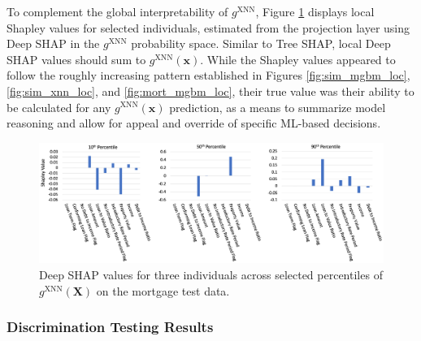 \documentclass[information,article,accept,moreauthors,pdftex]{Definitions/mdpi}
\begin{document}
{{{To complement the global interpretability of $g^\text{XNN}$, Figure \ref{fig:mort_xnn_loc} displays local Shapley values for selected individuals, estimated from the projection layer using Deep SHAP in the $g^\text{XNN}$ probability space. Similar to Tree SHAP, local Deep SHAP values should sum to $g^\text{XNN}(\mathbf{x})$. While the Shapley values appeared to follow the roughly increasing pattern established in Figures \ref{fig:sim_mgbm_loc}, \ref{fig:sim_xnn_loc}, and \ref{fig:mort_mgbm_loc}, their true value was their ability to be calculated for any $g^\text{XNN}(\mathbf{x})$ prediction, as a means to summarize model reasoning and allow for appeal and override of specific ML-based decisions. 

\begin{figure}[H]
\centering
\includegraphics[width=15cm]{img/mort_xnn_loc.png}
\caption{Deep SHAP values for three individuals across selected percentiles of $g^\text{XNN}(\mathbf{X})$ on the mortgage test data.}
\label{fig:mort_xnn_loc}
\end{figure}

\subsubsection{Discrimination Testing Results}\label{ssec:dis_mort}

}}}
\end{document}
